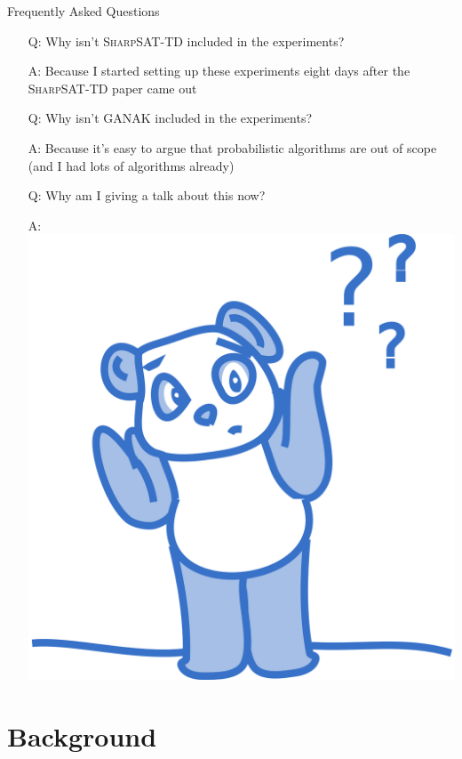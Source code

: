 \documentclass{beamer}
\begin{document}
\begin{frame}{Frequently Asked Questions}
  \begin{itemize}
    \item[Q:] \pause Why isn't \textsc{SharpSAT-TD} included in the experiments?
    \item[A:] Because I started setting up these experiments \alert{eight days}
          after the \textsc{SharpSAT-TD} paper came out
    \item[Q:] \pause Why isn't \textsc{GANAK} included in the experiments?
    \item[A:] Because it's easy to argue that probabilistic algorithms are
          \alert{out of scope} (and I had lots of algorithms already)
    \item[Q:] \pause Why am I giving a talk about this \alert{now}?
    \item[A:] \includegraphics[width=0.3\linewidth]{shrug}
  \end{itemize}
\end{frame}

\section{Background}
\end{document}
